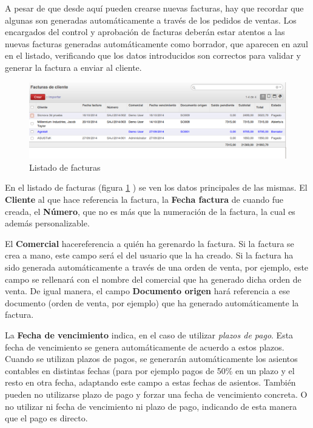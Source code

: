 A pesar de que desde aquí pueden crearse nuevas facturas, hay que recordar que algunas son generadas automáticamente a través de los pedidos de ventas. Los encargados del control y aprobación de facturas deberán estar atentos a las nuevas facturas generadas automáticamente como borrador, que aparecen en azul en el listado, verificando que los datos introducidos son correctos para validar y generar la factura a enviar al cliente.

\begin{figure}[H]
\includegraphics[width=\textwidth]{contabilidad/img/con_lisfact2.png}
\caption{Listado de facturas}
\label{con:lisfact}
\end{figure}


En el listado de facturas (figura \ref{con:lisfact} ) se ven los datos principales de las mismas. El \textbf{Cliente} al que hace referencia la factura, la \textbf{Fecha factura} de cuando fue creada, el \textbf{Número}, que no es más que la numeración de la factura, la cual es además personalizable. 

El \textbf{Comercial} hacereferencia a quién ha gerenardo la factura. Si la factura se crea a mano, este campo será el del usuario
que la ha creado. Si la factura ha sido generada automáticamente a través de una orden de venta, por ejemplo, este campo se rellenará con el nombre del comercial que ha generado dicha orden de venta. De igual manera, el campo \textbf{Documento origen} hará referencia a ese documento (orden de venta, por ejemplo) que ha generado automáticamente la factura.

La \textbf{Fecha de vencimiento} indica, en el caso de utilizar \emph{plazos de pago}. Esta fecha de vencimiento se genera automáticamente de acuerdo a estos plazos. Cuando se utilizan plazos de pagos, se generarán automáticamente los asientos contables en distintas fechas (para por  ejemplo pagos de 50\% en un plazo y el resto en otra fecha, adaptando este campo a estas fechas de asientos. También pueden no utilizarse plazo de pago y forzar una fecha de vencimiento concreta. O no utilizar ni fecha de vencimiento ni plazo de pago, indicando de esta manera que el pago es directo.


